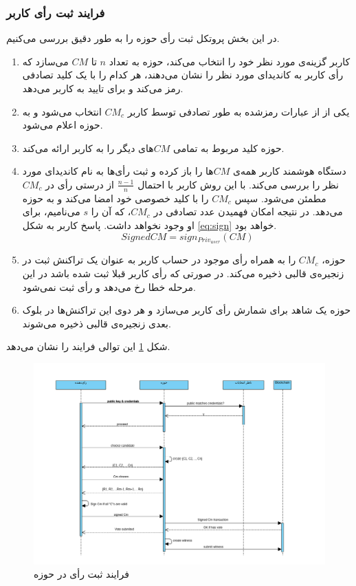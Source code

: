 \subsubsection{فرایند ثبت رأی کاربر}
در این بخش پروتکل ثبت رأی حوزه را به طور دقیق بررسی می‌کنیم. 

\begin{enumerate}
	\item 
	کاربر گزینه‌ی مورد نظر خود را انتخاب می‌کند، حوزه به تعداد $n$ تا $CM$ می‌سازد که رأی کاربر به کاندیدای مورد نظر را نشان می‌دهند، هر کدام را با یک کلید تصادفی رمز می‌کند و برای تایید به کاربر می‌دهد. 
	\item 
	یکی از از عبارات رمزشده به طور تصادفی توسط کاربر $CM_c$ انتخاب می‌شود و به حوزه اعلام می‌شود.
	\item 
	حوزه کلید مربوط به تمامی $CM$های دیگر را به کاربر ارائه می‌کند.
	\item 
	دستگاه هوشمند کاربر همه‌ی $CM$ها را باز کرده و ثبت رأی‌ها به نام کاندیدای مورد نظر را بررسی می‌کند. با این روش کاربر با احتمال $\frac{n-1}{n}$ از درستی رأی در $CM_c$ مطمئن می‌شود. سپس $CM_c$ را با کلید خصوصی خود امضا می‌کند و به حوزه می‌دهد. در نتیجه‌ امکان فهمیدن عدد تصادفی در $CM_c$، که آن را $s$ می‌نامیم، برای او وجود نخواهد داشت. پاسخ کاربر به شکل \ref{eq:sign} خواهد بود.
	\begin{equation}
	SignedCM = sign_{Priv_{user}} (CM)
	\label{eq:sign}
	\end{equation}
	
	\item
	حوزه، $CM_c$ را به همراه رأی موجود در حساب کاربر به عنوان یک تراکنش ثبت در زنجیره‌ی قالبی ذخیره می‌کند. در صورتی که رأی کاربر قبلا ثبت شده باشد در این مرحله خطا رخ می‌دهد و رأی ثبت نمی‌شود. 
	\item
	حوزه یک شاهد برای شمارش رأی کاربر می‌سازد و هر دوی این تراکنش‌ها در بلوک بعدی زنجیره‌ی قالبی ذخیره می‌شوند.
\end{enumerate}
شکل \ref{fig:seqdiag.png} این توالی فرایند را نشان می‌دهد.
\begin{figure}[h!]
	\centering
	\includegraphics[width=0.9\linewidth]{seqdiag.png}
	\caption {فرایند ثبت رأی در حوزه}
	\label{fig:seqdiag.png}
\end{figure}

